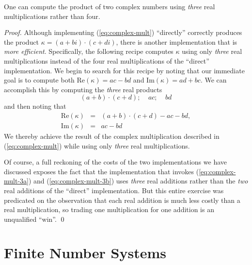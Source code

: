 
\begin{prop}
\label{thm:complex-mult-3real}
One can compute the product of two complex numbers using {\em three}
real multiplications rather than four.
\end{prop}

\begin{proof}
Although implementing (\ref{eq:complex-mult}) ``directly'' correctly
produces the product $\kappa = (a+bi) \cdot (c+di)$, there is another
implementation that is {\em more efficient}.  Specifically, the
following recipe computes $\kappa$ using only {\em three} real
multiplications instead of the four real multiplications of the
``direct'' implementation.  We begin to search for this recipe by
noting that our immediate goal is to compute both Re$(\kappa) = ac-bd$
and Im$(\kappa) = ad+bc$.  We can accomplish this by computing the
{\em three} real products
\begin{equation}
\label{eq:complex-mult-3a}
(a+b) \cdot (c+d); \ \ \ \ \
ac;  \ \ \ \ \ bd
\end{equation}
and then noting that
\begin{equation}
\label{eq:complex-mult-3b}
\begin{array}{lcl}
\mbox{Re}(\kappa) & = & (a+b) \cdot (c+d) - ac -bd, \\
\mbox{Im}(\kappa) & = & ac -bd
\end{array}
\end{equation}
We thereby achieve the result of the complex multiplication described
in (\ref{eq:complex-mult}) while using only {\em three} real
multiplications.

Of course, a full reckoning of the costs of the two implementations we
have discussed exposes the fact that the implementation that invokes
(\ref{eq:complex-mult-3a}) and (\ref{eq:complex-mult-3b}) uses {\em
  three} real additions rather than the {\em two} real additions of
the ``direct'' implementation.  But this entire exercise was
predicated on the observation that each real addition is much less
costly than a real multiplication, so trading one multiplication for
one addition is an unqualified ``win''.  \qed
\end{proof}


\section{Finite Number Systems}
\label{sec:congruences+modular}

